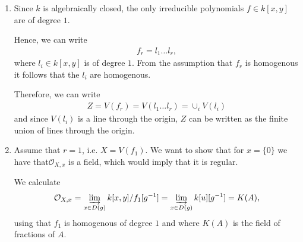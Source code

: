 \newcommand{\sheet}{11}




\maketitle{}

\begin{exercise}{3}
    \begin{enumerate}
        \item Since $k$ is algebraically closed, the only irreducible polynomials $f\in k[x,y]$ are of degree $1$.
        
        Hence, we can write 
        \begin{align*}
            f_r=l_1  \dots  l_r,
        \end{align*}
        where $l_i\in k[x,y]$ is of degree $1$. From the assumption that $f_r$ is homogenous it follows that the $l_i$ are homogenous.

        Therefore, we can write
        \begin{align*}
            Z=V(f_r)=V(l_1 \dots  l_r)=\cup_i V(l_i)
        \end{align*}
        and since $V(l_i)$ is a line through the origin, $Z$ can be written as the finite union of lines through the origin.

        \item Assume that $r=1$, i.e. $X=V(f_1).$
        We want to show that for $x=\lbrace 0 \rbrace$ we have that$\mathcal{O}_{X,x}$ is a field, which would imply that it is regular.

        We calculate 
        \begin{align*}
            \mathcal{O}_{X,x}=\varinjlim_{x\in D(g)} k[x,y]/f_1 [g^{-1}]=\varinjlim_{x\in D(g)} k[u] [g^{-1}]=K(A),
        \end{align*}
        using that $f_1$ is homogenous of degree $1$ and where $K(A)$ is the field of fractions of $A$.


    \end{enumerate}

\end{exercise}


